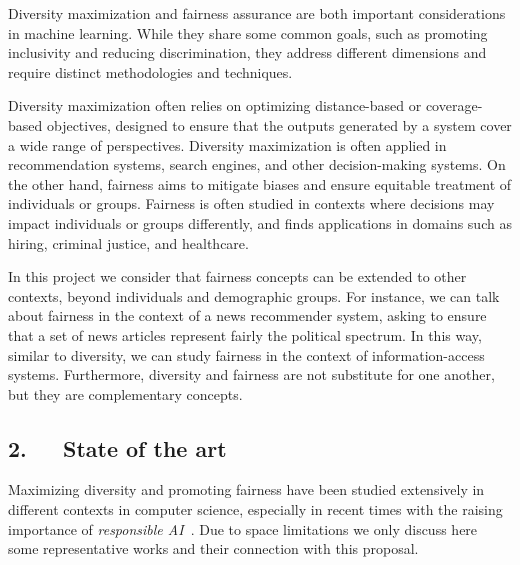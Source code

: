 \documentclass[a4paper,11pt]{article}
\begin{document}
Diversity maximization and fairness assurance are both important considerations in machine learning.
While they share some common goals, such as promoting inclusivity and reducing discrimination, 
they address different dimensions and require distinct methodologies and techniques. 

Diversity maximization often relies on optimizing distance-based or coverage-based objectives, 
designed to ensure that the outputs generated by a system cover a wide range of perspectives. 
Diversity maxi\-mi\-za\-tion is often applied in recommendation systems, search engines, 
and other decision-making systems. 
%
On the other hand, 
fairness aims to mitigate biases and ensure equitable treatment of individuals or groups.
Fairness is often studied in contexts where decisions may impact individuals or groups differently, 
and finds applications in domains such as hiring, criminal justice, and healthcare.

In this project we consider that fairness concepts can be extended to other contexts,  
beyond individuals and demographic groups. 
For instance, we can talk about fairness in the context of a news recommender system, 
asking to ensure that a set of news articles represent fairly the political spectrum.
In this way, similar to diversity, we can study fairness in the context of information-access systems.
Furthermore, diversity and fairness are not substitute for one another, 
but they are complementary concepts.

\subsection*{2.~~~State of the art}

Maximizing diversity and promoting fairness have been studied 
extensively in different contexts in computer science, 
especially in recent times with the raising importance of \emph{responsible AI}~\cite{dignum2019responsible}.
Due to space limitations we only discuss here some representative works
and their connection with this proposal.

\end{document}
